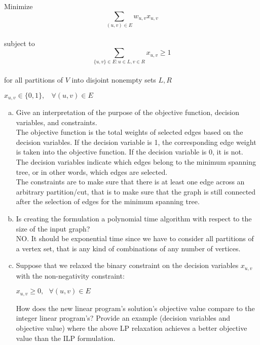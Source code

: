 \documentclass{article}\usepackage[utf8]{inputenc}\usepackage[margin=0.4cm,top=0.4cm,bottom=0.4cm]{geometry}\usepackage[usenames,dvipsnames,svgnames,table]{xcolor}
\newcommand\tab[1][1cm]{\hspace*{#1}}
\begin{document}
\hspace{10mm} Minimize $$\sum_{(u,v)\in E} w_{u,v}x_{u,v}$$\\
\tab\hspace{5.5mm} subject to $$\sum_{\{u,v\}\in E:u\in L,v\in R} x_{u,v}\geq 1$$\\
\tab\hspace{5.5mm} for all partitions of $V$ into disjoint nonempty sets $L,R$
\begin{center} $x_{u,v}\in\{0,1\}, \ \ \ \ \forall(u, v)\in E$ \end{center}
\begin{enumerate}[(a)]
\item Give an interpretation of the purpose of the objective function, decision variables, and constraints.
\BeginSolution %
\\
The objective function is the total weights of selected edges based on the decision variables. If the decision variable is 1, the corresponding edge weight is taken into the objective function. If the decision variable is 0, it is not.\\
The decision variables indicate which edges belong to the minimum spanning tree, or in other words, which edges are selected.\\
The constraints are to make sure that there is at least one edge across an arbitrary partition/cut, that is to make sure that the graph is still connected after the selection of edges for the minimum spanning tree.
\EndSolution
\item Is creating the formulation a polynomial time algorithm with respect to the size of the input graph?
\BeginSolution %
\\
NO. It should be exponential time since we have to consider all partitions of a vertex set, that is any kind of combinations of any number of vertices. 
\EndSolution
\item Suppose that we relaxed the binary constraint on the decision variables $x_{u,v}$ with the non-negativity constraint:
\begin{center}
$x_{u,v}\geq0,\ \ \ \forall(u,v)\in E$
\end{center}
How does the new linear program's solution's objective value compare to the integer linear program's? Provide an example (decision variables and objective value) where the above LP relaxation achieves a better objective value than the ILP formulation.
\BeginSolution %
\\

\end{enumerate}
\end{document}

